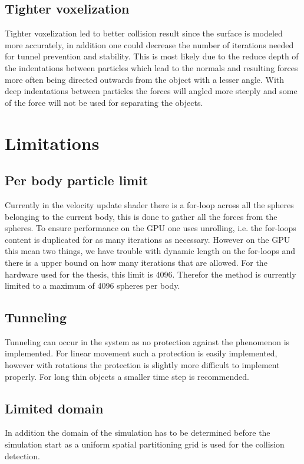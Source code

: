 \subsection{Tighter voxelization}
Tighter voxelization led to better collision result since the surface is modeled
more accurately, in addition one could decrease the number of iterations needed
for tunnel prevention and stability. This is most likely due to the reduce depth
of the indentations between particles which lead to the normals and resulting forces more often
being directed outwards from the object with a lesser angle.
 With deep indentations between particles the forces will angled more steeply and
  some of the force will not be used for separating the objects.

\section{Limitations}
\subsection{Per body particle limit}
Currently in the velocity update shader there is a for-loop across all the spheres
belonging to the current body, this is done to gather all the forces from the spheres.
To ensure performance on the GPU one uses unrolling, i.e. the for-loops content is
duplicated for as many iterations as necessary. However on the GPU this mean two
things, we have trouble with dynamic length on the for-loops and there is a upper
bound on how many iterations that are allowed. For the hardware used for the thesis,
this limit is 4096. Therefor the method is currently limited to a maximum of 4096
spheres per body.

\subsection{Tunneling}
Tunneling can occur in the system as no protection against the phenomenon is implemented.
For linear movement such a protection is easily implemented, however with rotations
the protection is slightly more difficult to implement properly. For long thin
objects a smaller time step is recommended.
\subsection{Limited domain}
In addition the domain of the simulation has to be determined before the simulation start
as a uniform spatial partitioning grid is used for the collision detection.

